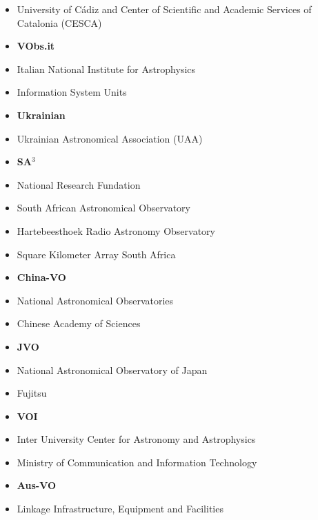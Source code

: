 \begin{itemize}
	\item University of Cádiz and Center of Scientific and Academic Services of Catalonia (CESCA)
	\item \textbf{VObs.it}
	\item Italian National Institute for Astrophysics
	\item Information System Units
	\item \textbf{Ukrainian}
	\item Ukrainian Astronomical Association (UAA)
	\item \textbf{SA$^3$}
	\item National Research Fundation
	\item South African Astronomical Observatory
	\item Hartebeesthoek Radio Astronomy Observatory
	\item Square Kilometer Array South Africa 
	\item \textbf{China-VO}
	\item National Astronomical Observatories
	\item Chinese Academy of Sciences
	\item \textbf{JVO}
	\item National Astronomical Observatory of Japan
	\item Fujitsu
	\item \textbf{VOI}
	\item Inter University Center for Astronomy and Astrophysics
	\item Ministry of Communication and Information Technology
	\item \textbf{Aus-VO}
	\item Linkage Infrastructure, Equipment and Facilities
\end{itemize}




